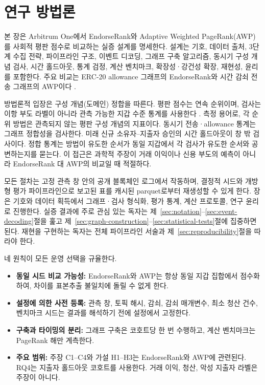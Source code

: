﻿%
\chapter{연구 방법론}
\label{ch:methodology}

본 장은 Arbitrum One에서 EndorseRank와 Adaptive Weighted PageRank(AWP)를 사회적 평판 점수로 비교하는 실증 설계를 명세한다. 설계는 기호, 데이터 출처, 3단계 수집 전략, 파이프라인 구조, 이벤트 디코딩, 그래프 구축 알고리즘, 동시기 구성 개념 검사, 시간 홀드아웃, 통계 검정, 계산 벤치마크, 확장성·강건성 확장, 재현성, 윤리를 포함한다. 주요 비교는 ERC-20 allowance 그래프의 EndorseRank와 시간 감쇠 전송 그래프의 AWP이다 .

방법론적 입장은 구성 개념(도메인) 정합을 따른다. 평판 점수는 연속 순위이며, 검사는 이항 부도 라벨이 아니라 관측 가능한 지갑 수준 통계를 사용한다 . 측정 용어로, 각 순위 방법은 관측되지 않는 평판 구성 개념의 지표이다. 동시기 전송·allowance 통계는 그래프 정합성을 검사한다. 미래 신규 소유자--지출자 승인의 시간 홀드아웃이 창 밖 검사이다. 정합 통계는 방법이 유도한 순서가 동일 지갑에서 각 검사가 유도한 순서와 공변하는지를 묻는다. 이 접근은 과학적 주장이 거래 이익이나 신용 부도의 예측이 아니라 EndorseRank 대 AWP의 비교일 때 적절하다.

모든 절차는 고정 관측 창 안의 공개 블록체인 로그에서 작동하며, 결정적 시드와 개방형 평가 파이프라인으로 보고된 표를 캐시된 parquet로부터 재생성할 수 있게 한다. 장은 기호와 데이터 획득에서 그래프·검사 형식화, 평가 통계, 계산 프로토콜, 연구 윤리로 진행한다. 실증 결과에 주로 관심 있는 독자는 제~\ref{sec:notation}--\ref{sec:event-decoding}절을 훑고 제~\ref{sec:graph-construction}--\ref{sec:statistical-tests}절에 집중하면 된다. 재현을 구현하는 독자는 전체 파이프라인 서술과 제~\ref{sec:reproducibility}절을 따라야 한다.

네 원칙이 모든 운영 선택을 규율한다.
\begin{itemize}
\item \textbf{동일 시드 비교 가능성:} EndorseRank와 AWP는 항상 동일 지갑 집합에서 점수화하여, 차이를 표본추출 불일치에 돌릴 수 없게 한다.
\item \textbf{설정에 의한 사전 등록:} 관측 창, 토픽 해시, 감쇠, 감쇠 매개변수, 최소 청산 건수, 벤치마크 시드는 결과를 해석하기 전에 설정에서 고정한다.
\item \textbf{구축과 타이밍의 분리:} 그래프 구축은 코호트당 한 번 수행하고, 계산 벤치마크는 PageRank 해만 계측한다.
\item \textbf{주요 범위:} 주장 C1--C4와 가설 H1--H3는 EndorseRank와 AWP에 관련된다. RQ4는 지출자 홀드아웃 코호트를 사용한다. 거래 이익, 청산, 악성 지출자 라벨은 주장이 아니다.
\end{itemize}

